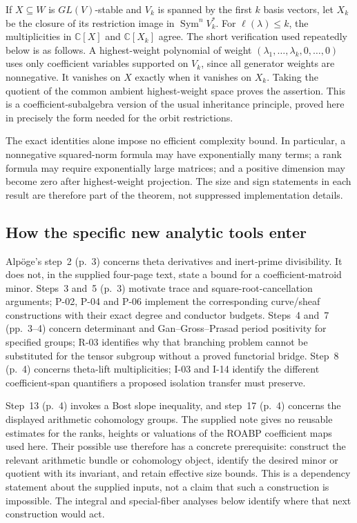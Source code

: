 If $X\subseteq W$ is $GL(V)$-stable and $V_k$ is spanned by the first $k$ basis vectors, let $X_k$ be the closure of its restriction image in $\operatorname{Sym}^nV_k^*$. For $\ell(\lambda)\leq k$, the multiplicities in $\mathbb C[X]$ and $\mathbb C[X_k]$ agree. The short verification used repeatedly below is as follows. A highest-weight polynomial of weight $(\lambda_1,\ldots,\lambda_k,0,\ldots,0)$ uses only coefficient variables supported on $V_k$, since all generator weights are nonnegative. It vanishes on $X$ exactly when it vanishes on $X_k$. Taking the quotient of the common ambient highest-weight space proves the assertion. This is a coefficient-subalgebra version of the usual inheritance principle, proved here in precisely the form needed for the orbit restrictions.

The exact identities alone impose no efficient complexity bound. In particular, a nonnegative squared-norm formula may have exponentially many terms; a rank formula may require exponentially large matrices; and a positive dimension may become zero after highest-weight projection. The size and sign statements in each result are therefore part of the theorem, not suppressed implementation details.

\subsection{How the specific new analytic tools enter}

Alp\"oge's step~2 (p.~3) concerns theta derivatives and inert-prime divisibility. It does not, in the supplied four-page text, state a bound for a coefficient-matroid minor. Steps~3 and~5 (p.~3) motivate trace and square-root-cancellation arguments; P-02, P-04 and P-06 implement the corresponding curve/sheaf constructions with their exact degree and conductor budgets. Steps~4 and~7 (pp.~3--4) concern determinant and Gan--Gross--Prasad period positivity for specified groups; R-03 identifies why that branching problem cannot be substituted for the tensor subgroup without a proved functorial bridge. Step~8 (p.~4) concerns theta-lift multiplicities; I-03 and I-14 identify the different coefficient-span quantifiers a proposed isolation transfer must preserve.

Step~13 (p.~4) invokes a Bost slope inequality, and step~17 (p.~4) concerns the displayed arithmetic cohomology groups. The supplied note gives no reusable estimates for the ranks, heights or valuations of the ROABP coefficient maps used here. Their possible use therefore has a concrete prerequisite: construct the relevant arithmetic bundle or cohomology object, identify the desired minor or quotient with its invariant, and retain effective size bounds. This is a dependency statement about the supplied inputs, not a claim that such a construction is impossible. The integral and special-fiber analyses below identify where that next construction would act.
